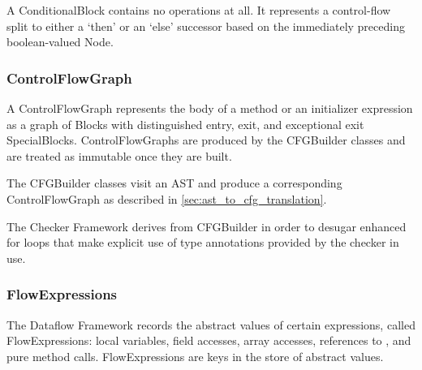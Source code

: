 

    A ConditionalBlock contains no operations at all.  It represents a control-flow split to either a `then' or an `else' successor based on the immediately preceding boolean-valued Node.

    
    


\subsubsection{ControlFlowGraph}
\label{sec:control_flow_graph_class}

     A ControlFlowGraph represents the body of a method or an initializer expression as a graph of Blocks with distinguished entry, exit, and exceptional exit SpecialBlocks.  ControlFlowGraphs are produced by the CFGBuilder classes and are treated as immutable once they are built.


\label{sec:cfg_builder_classes}
    
    The CFGBuilder classes visit an AST and produce a corresponding ControlFlowGraph as described in \autoref{sec:ast_to_cfg_translation}.
    
        
    The Checker Framework derives from CFGBuilder in order to desugar enhanced for loops that make explicit use of type annotations provided by the checker in use.
        


\subsubsection{FlowExpressions}
\label{sec:flow_expressions_class}

    The Dataflow Framework records the abstract values of certain
    expressions, called FlowExpressions:  local variables, field accesses,
    array accesses, references to , and pure method calls.
    FlowExpressions are keys in the store of abstract values.


